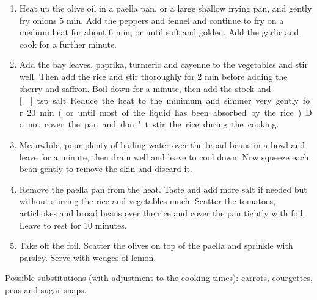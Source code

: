 \documentclass[main.tex]{subfiles}
\begin{document}
\begin{enumerate}
    \item Heat up the olive oil in a paella pan, or a large shallow frying pan, and gently fry onions 5 min. Add the peppers and fennel and continue to fry on a medium heat for about 6 min, or until soft and golden. Add the garlic and cook for a further minute.
    \item Add the bay leaves, paprika, turmeric and cayenne to the vegetables and stir well. Then add the rice and stir thoroughly for 2 min before adding the sherry and saffron. Boil down for a minute, then add the stock and \unit[]{tsp} salt. Reduce the heat to the minimum and simmer very gently for 20 min (or until most of the liquid has been absorbed by the rice). Do not cover the pan and don't stir the rice during the cooking.
    \item Meanwhile, pour plenty of boiling water over the broad beans in a bowl and leave for a minute, then drain well and leave to cool down. Now squeeze each bean gently to remove the skin and discard it.
    \item Remove the paella pan from the heat. Taste and add more salt if needed but without stirring the rice and vegetables much. Scatter the tomatoes, artichokes and broad beans over the rice and cover the pan tightly with foil. Leave to rest for 10 minutes.
    \item Take off the foil. Scatter the olives on top of the paella and sprinkle with parsley. Serve with wedges of lemon.
\end{enumerate}
Possible substitutions (with adjustment to the cooking times): carrots, courgettes, peas and sugar snaps.
\end{document}

